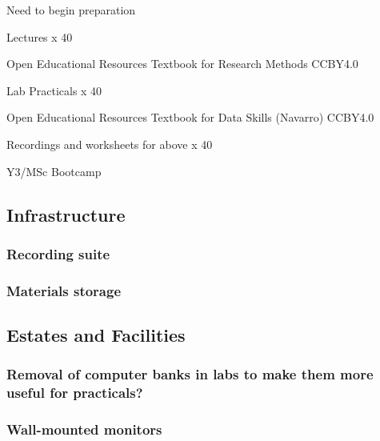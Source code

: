 \documentclass[
  11pt,
  letterpaper,
  oneside,
  open=any]{scrbook}
\begin{document}
Need to begin preparation

Lectures x 40

Open Educational Resources Textbook for Research Methods CCBY4.0

Lab Practicals x 40

Open Educational Resources Textbook for Data Skills (Navarro) CCBY4.0

Recordings and worksheets for above x 40

Y3/MSc Bootcamp

\hypertarget{infrastructure}{%
\subsection{Infrastructure}\label{infrastructure}}

\hypertarget{recording-suite}{%
\subsubsection{Recording suite}\label{recording-suite}}

\hypertarget{materials-storage}{%
\subsubsection{Materials storage}\label{materials-storage}}

\hypertarget{estates-and-facilities}{%
\subsection{Estates and Facilities}\label{estates-and-facilities}}

\hypertarget{removal-of-computer-banks-in-labs-to-make-them-more-useful-for-practicals}{%
\subsubsection{Removal of computer banks in labs to make them more
useful for
practicals?}\label{removal-of-computer-banks-in-labs-to-make-them-more-useful-for-practicals}}

\hypertarget{wall-mounted-monitors}{%
\subsubsection{Wall-mounted monitors}\label{wall-mounted-monitors}}

\hypertarget{section}{%
\subsubsection{}\label{section}}
\end{document}
